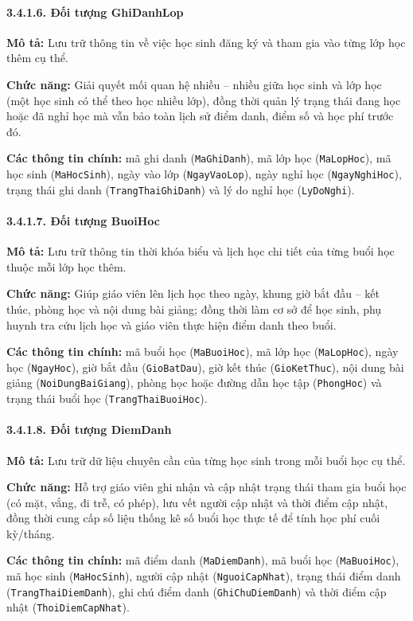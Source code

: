 \documentclass[12pt,a4paper]{article}
\begin{document}
\paragraph{3.4.1.6. Đối tượng GhiDanhLop}\mbox{}\par
\textbf{Mô tả:} Lưu trữ thông tin về việc học sinh đăng ký và tham gia vào từng lớp học thêm cụ thể.\par
\textbf{Chức năng:} Giải quyết mối quan hệ nhiều -- nhiều giữa học sinh và lớp học (một học sinh có thể theo học nhiều lớp), đồng thời quản lý trạng thái đang học hoặc đã nghỉ học mà vẫn bảo toàn lịch sử điểm danh, điểm số và học phí trước đó.\par
\textbf{Các thông tin chính:} mã ghi danh (\texttt{MaGhiDanh}), mã lớp học (\texttt{MaLopHoc}), mã học sinh (\texttt{MaHocSinh}), ngày vào lớp (\texttt{NgayVaoLop}), ngày nghỉ học (\texttt{NgayNghiHoc}), trạng thái ghi danh (\texttt{TrangThaiGhiDanh}) và lý do nghỉ học (\texttt{LyDoNghi}).

\paragraph{3.4.1.7. Đối tượng BuoiHoc}\mbox{}\par
\textbf{Mô tả:} Lưu trữ thông tin thời khóa biểu và lịch học chi tiết của từng buổi học thuộc mỗi lớp học thêm.\par
\textbf{Chức năng:} Giúp giáo viên lên lịch học theo ngày, khung giờ bắt đầu -- kết thúc, phòng học và nội dung bài giảng; đồng thời làm cơ sở để học sinh, phụ huynh tra cứu lịch học và giáo viên thực hiện điểm danh theo buổi.\par
\textbf{Các thông tin chính:} mã buổi học (\texttt{MaBuoiHoc}), mã lớp học (\texttt{MaLopHoc}), ngày học (\texttt{NgayHoc}), giờ bắt đầu (\texttt{GioBatDau}), giờ kết thúc (\texttt{GioKetThuc}), nội dung bài giảng (\texttt{NoiDungBaiGiang}), phòng học hoặc đường dẫn học tập (\texttt{PhongHoc}) và trạng thái buổi học (\texttt{TrangThaiBuoiHoc}).

\paragraph{3.4.1.8. Đối tượng DiemDanh}\mbox{}\par
\textbf{Mô tả:} Lưu trữ dữ liệu chuyên cần của từng học sinh trong mỗi buổi học cụ thể.\par
\textbf{Chức năng:} Hỗ trợ giáo viên ghi nhận và cập nhật trạng thái tham gia buổi học (có mặt, vắng, đi trễ, có phép), lưu vết người cập nhật và thời điểm cập nhật, đồng thời cung cấp số liệu thống kê số buổi học thực tế để tính học phí cuối kỳ/tháng.\par
\textbf{Các thông tin chính:} mã điểm danh (\texttt{MaDiemDanh}), mã buổi học (\texttt{MaBuoiHoc}), mã học sinh (\texttt{MaHocSinh}), người cập nhật (\texttt{NguoiCapNhat}), trạng thái điểm danh (\texttt{TrangThaiDiemDanh}), ghi chú điểm danh (\texttt{GhiChuDiemDanh}) và thời điểm cập nhật (\texttt{ThoiDiemCapNhat}).
\end{document}
